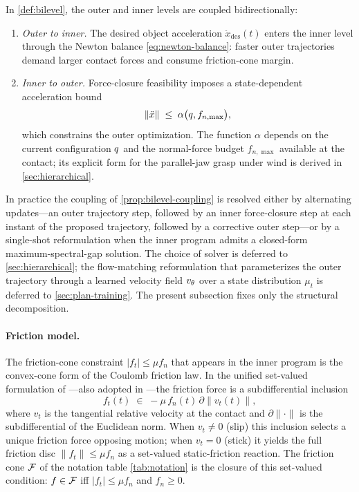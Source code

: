 \begin{proposition}\label{prop:bilevel-coupling}
In \cref{def:bilevel}, the outer and inner levels are coupled
bidirectionally:
\begin{enumerate}[label=(\roman*),nosep]
  \item \emph{Outer to inner.} The desired object acceleration
    $\ddot{x}_{\mathrm{des}}(t)$ enters the inner level through
    the Newton balance \eqref{eq:newton-balance}: faster outer
    trajectories demand larger contact forces and consume
    friction-cone margin.
  \item \emph{Inner to outer.} Force-closure feasibility imposes
    a state-dependent acceleration bound
    \begin{equation}
    \label{eq:accel-bound}
      \|\ddot{x}\|
      \;\le\;
      \alpha\bigl(q, f_{n,\max}\bigr),
    \end{equation}
    which constrains the outer optimization. The function
    $\alpha$ depends on the current configuration $q$ and
    the normal-force budget $f_{n,\max}$ available at the contact;
    its explicit form for the parallel-jaw grasp under wind is
    derived in \cref{sec:hierarchical}.
\end{enumerate}
\end{proposition}

In practice the coupling of \cref{prop:bilevel-coupling} is
resolved either by alternating updates---an outer trajectory step,
followed by an inner force-closure step at each instant of the
proposed trajectory, followed by a corrective outer step---or by a
single-shot reformulation when the inner program admits a
closed-form maximum-spectral-gap solution. The choice of solver
is deferred to \cref{sec:hierarchical}; the
flow-matching reformulation that parameterizes the outer
trajectory through a learned velocity field $v_{\theta}$ over a
state distribution $\mu_{t}$ is deferred to
\cref{sec:plan-training}. The present subsection fixes only the
structural decomposition.

\paragraph{Friction model.}
The friction-cone constraint $|f_{t}| \le \mu f_{n}$ that appears
in the inner program is the convex-cone form of the Coulomb
friction law. In the unified set-valued formulation of
\citet{Stewart2000}---also adopted in \citet{Brogliato2016}---the
friction force is a subdifferential inclusion
\begin{equation}
\label{eq:friction-di}
  f_{t}(t) \;\in\; -\mu\, f_{n}(t)\,
  \partial \!\left\| v_{t}(t) \right\|,
\end{equation}
where $v_{t}$ is the tangential relative velocity at the contact
and $\partial\|\cdot\|$ is the subdifferential of the Euclidean
norm. When $v_{t} \neq 0$ (slip) this inclusion selects a unique
friction force opposing motion; when $v_{t} = 0$ (stick) it yields
the full friction disc $\|f_{t}\| \le \mu f_{n}$ as a set-valued
static-friction reaction. The friction cone $\mathcal{F}$
of the notation table \eqref{tab:notation} is the closure of this
set-valued condition: $f \in \mathcal{F}$ iff $|f_{t}| \le
\mu f_{n}$ and $f_{n} \ge 0$.

